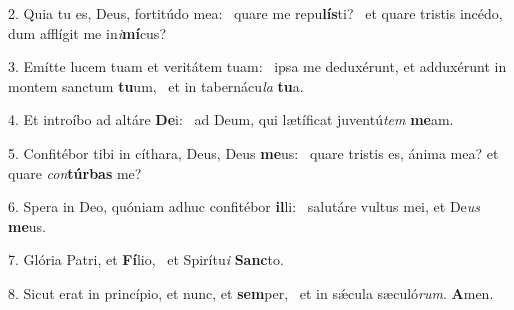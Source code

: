 2. Quia tu es, Deus, fortitúdo mea: \dag\  quare me repu\textbf{lís}ti? \ast\  et quare tristis incédo, dum afflígit me in\textit{i}\textbf{mí}cus?\

3. Emítte lucem tuam et veritátem tuam: \dag\  ipsa me deduxérunt, et adduxérunt in montem sanctum \textbf{tu}um, \ast\  et in tabernácu\textit{la} \textbf{tu}a.\

4. Et introíbo ad altáre \textbf{De}i: \ast\  ad Deum, qui lætíficat juventú\textit{tem} \textbf{me}am.\

5. Confitébor tibi in cíthara, Deus, Deus \textbf{me}us: \ast\  quare tristis es, ánima mea? et quare \textit{con}\textbf{túr}\textbf{bas} me?\

6. Spera in Deo, quóniam adhuc confitébor \textbf{il}li: \ast\  salutáre vultus mei, et De\textit{us} \textbf{me}us.\

7. Glória Patri, et \textbf{Fí}lio, \ast\  et Spirítu\textit{i} \textbf{Sanc}to.\

8. Sicut erat in princípio, et nunc, et \textbf{sem}per, \ast\  et in sǽcula sæculó\textit{rum}. \textbf{A}men.\

